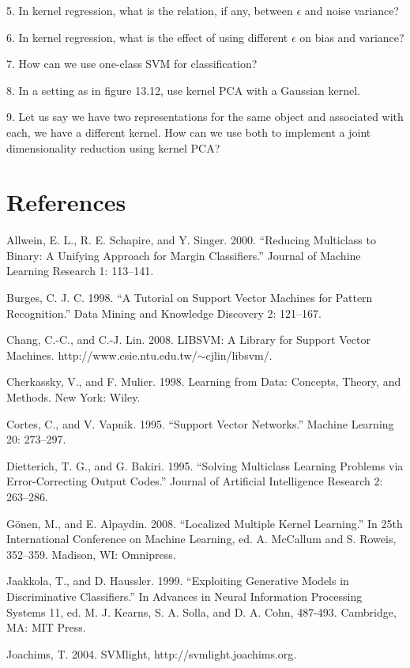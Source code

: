 5. In kernel regression, what is the relation, if any, between $\epsilon$ and noise variance?

6. In kernel regression, what is the effect of using different $\epsilon$ on bias and variance?

7. How can we use one-class SVM for classification?

8. In a setting as in figure 13.12, use kernel PCA with a Gaussian kernel.

9. Let us say we have two representations for the same object and associated with each, we have a different kernel. How can we use both to implement a joint dimensionality reduction using kernel PCA?

\section{References}

Allwein, E. L., R. E. Schapire, and Y. Singer. 2000. “Reducing Multiclass to Binary: A Unifying Approach for Margin Classifiers.” Journal of Machine Learning Research 1: 113--141.

Burges, C. J. C. 1998. “A Tutorial on Support Vector Machines for Pattern Recognition.” Data Mining and Knowledge Discovery 2: 121--167.

Chang, C.-C., and C.-J. Lin. 2008. LIBSVM: A Library for Support Vector Machines. http://www.csie.ntu.edu.tw/$\sim$cjlin/libsvm/.

Cherkassky, V., and F. Mulier. 1998. Learning from Data: Concepts, Theory, and Methods. New York: Wiley.

Cortes, C., and V. Vapnik. 1995. “Support Vector Networks.” Machine Learning 20: 273--297.

Dietterich, T. G., and G. Bakiri. 1995. “Solving Multiclass Learning Problems via Error-Correcting Output Codes.” Journal of Artificial Intelligence Research 2: 263--286.

Gönen, M., and E. Alpaydin. 2008. “Localized Multiple Kernel Learning.” In 25th International Conference on Machine Learning, ed. A. McCallum and S. Roweis, 352--359. Madison, WI: Omnipress.

Jaakkola, T., and D. Haussler. 1999. “Exploiting Generative Models in Discriminative Classifiers.” In Advances in Neural Information Processing Systems 11, ed. M. J. Kearns, S. A. Solla, and D. A. Cohn, 487-493. Cambridge, MA: MIT Press.

Joachims, T. 2004. SVMlight, http://svmlight.joachims.org.

